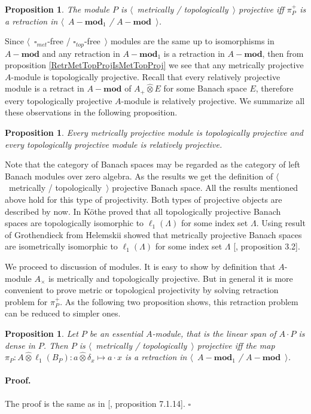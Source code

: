\documentclass[12pt]{article}
\newcommand{\projtens}{\mathbin{\widehat{\otimes}}}
\newtheorem{proposition}[theorem]{Proposition}
\renewenvironment{proof}{\paragraph{Proof.}}{\hfill$\square$\medskip}
\begin{document}
\begin{proposition}\label{MetTopProjModViaCanonicMorph}
The module $P$ is $\langle$~metrically / topologically~$\rangle$ projective iff $\pi_P^+$ is a retraction in $\langle$~$A-\mathbf{mod}_1$ / $A-\mathbf{mod}$~$\rangle$.
\end{proposition}

Since $\langle$~$\square_{met}$-free / $\square_{top}$-free~$\rangle$ modules are the same up to isomorphisms in $A-\mathbf{mod}$ and any retraction in $A-\mathbf{mod}_1$ is a retraction in $A-\mathbf{mod}$, then from proposition \ref{RetrMetTopProjIsMetTopProj} we see that any metrically projective $A$-module is topologically projective. Recall that every relatively projective module is a retract in $A-\mathbf{mod}$ of $A_+\projtens E$ for some Banach space $E$, therefore every topologically projective $A$-module is relatively projective. We summarize all these observations in the following proposition.

\begin{proposition}\label{MetProjIsTopProjAndTopProjIsRelProj} Every metrically projective module is topologically projective and every topologically projective module is relatively projective.
\end{proposition}

Note that the category of Banach spaces may be regarded as the category of left Banach modules over zero algebra. As the results we get the definition of $\langle$~metrically / topologically~$\rangle$ projective Banach space. All the results mentioned above hold for this type of projectivity. Both types of projective objects are described by now. In \cite{KotheTopProjBanSp} K{\"o}the proved that all topologically projective Banach spaces are topologically isomorphic to $\ell_1(\Lambda)$ for some index set $\Lambda$. Using result of Grothendieck from \cite{GrothMetrProjFlatBanSp} Helemskii showed that metrically projective Banach spaces are isometrically isomorphic to $\ell_1(\Lambda)$ for some index set $\Lambda$ [\cite{HelMetrFrQMod}, proposition 3.2]. 

We proceed to discussion of modules. It is easy to show by definition that $A$-module $A_\times$ is metrically and topologically projective. But in general it is more convenient to prove metric or topological projectivity by solving retraction problem for $\pi_P^+$. As the following two proposition shows, this retraction problem can be reduced to simpler ones.

\begin{proposition}\label{NonDegenMetTopProjCharac}  Let $P$ be an essential $A$-module, that is the linear span of $A\cdot P$ is dense in $P$. Then $P$ is $\langle$~metrically / topologically~$\rangle$ projective iff the map $\pi_P:A\projtens\ell_1(B_P):a\projtens\delta_x\mapsto a\cdot x$ is a retraction in $\langle$~$A-\mathbf{mod}_1$ / $A-\mathbf{mod}$~$\rangle$.
\end{proposition} 
\begin{proof} The proof is the same as in [\cite{HelBanLocConvAlg}, proposition	 7.1.14].
\end{proof}
\end{document}
